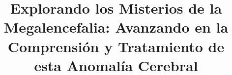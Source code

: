 \documentclass{bmcart}
\begin{document}
	\begin{frontmatter}
	
		\begin{fmbox}
			
			
			\title{Explorando los Misterios de la Megalencefalia: Avanzando en la Comprensión y Tratamiento de esta Anomalía Cerebral}
			
			
			\author[
			  addressref={aff1},                   %
			  corref={aff1},                       %
			  email={mruizvillarrazo@gmail.com}   %
			]{ } %
			\author[
			  addressref={aff1},
			  email={florinb@uma.es}
			]{ }
			\author[
			  addressref={aff1},
			  email={raulobreroberlanga@uma.es}
			]{ }
			\author[
			  addressref={aff1},
			  email={claudia.vegarodriguez@uma.es}
			]{ }
			
			
			\address[id=aff1]{%
			  ,             %
			  ,          %
			  ,                              %
			}
		
		\end{fmbox}%
		
		\begin{abstractbox}
		
			\begin{abstract} %
			


\end{abstract}
\end{abstractbox}
\end{frontmatter}
\end{document}
